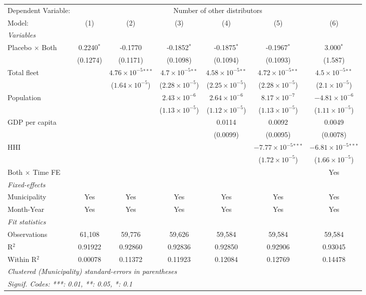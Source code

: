 \documentclass[
]{article}
\begin{document}
\begin{tabular}{lcccccc}
\tabularnewline\midrule\midrule
Dependent Variable:&\multicolumn{6}{c}{Number of other distributors}\\
Model:&(1) & (2) & (3) & (4) & (5) & (6)\\
\midrule \emph{Variables}&   &   &   &   &   &  \\
Placebo $\times $ Both & 0.2240$^{*}$ & -0.1770 & -0.1852$^{*}$ & -0.1875$^{*}$ & -0.1967$^{*}$ & 3.000$^{*}$\\
  &(0.1274) & (0.1171) & (0.1098) & (0.1094) & (0.1093) & (1.587)\\
Total fleet &    & $4.76\times 10^{-5}$$^{***}$ & $4.7\times 10^{-5}$$^{**}$ & $4.58\times 10^{-5}$$^{**}$ & $4.72\times 10^{-5}$$^{**}$ & $4.5\times 10^{-5}$$^{**}$\\
  &   & ($1.64\times 10^{-5}$) & ($2.28\times 10^{-5}$) & ($2.25\times 10^{-5}$) & ($2.28\times 10^{-5}$) & ($2.1\times 10^{-5}$)\\
Population &    &    & $2.43\times 10^{-6}$ & $2.64\times 10^{-6}$ & $8.17\times 10^{-7}$ & $-4.81\times 10^{-6}$\\
  &   &    & ($1.13\times 10^{-5}$) & ($1.12\times 10^{-5}$) & ($1.13\times 10^{-5}$) & ($1.11\times 10^{-5}$)\\
GDP per capita &    &    &    & 0.0114 & 0.0092 & 0.0049\\
  &   &    &    & (0.0099) & (0.0095) & (0.0078)\\
HHI &    &    &    &    & $-7.77\times 10^{-5}$$^{***}$ & $-6.81\times 10^{-5}$$^{***}$\\
  &   &    &    &    & ($1.72\times 10^{-5}$) & ($1.66\times 10^{-5}$)\\
Both $\times$ Time FE &  &  &  &  &  & Yes\\
\midrule \emph{Fixed-effects}&   &   &   &   &   &  \\
Municipality & Yes & Yes & Yes & Yes & Yes & Yes\\
Month-Year & Yes & Yes & Yes & Yes & Yes & Yes\\
\midrule \emph{Fit statistics}&  & & & & & \\
Observations & 61,108&59,776&59,626&59,584&59,584&59,584\\
R$^2$ & 0.91922&0.92860&0.92836&0.92850&0.92906&0.93045\\
Within R$^2$ & 0.00078&0.11372&0.11923&0.12084&0.12769&0.14478\\
\midrule\midrule\multicolumn{7}{l}{\emph{Clustered (Municipality) standard-errors in parentheses}}\\
\multicolumn{7}{l}{\emph{Signif. Codes: ***: 0.01, **: 0.05, *: 0.1}}\\
\end{tabular}
\end{document}
